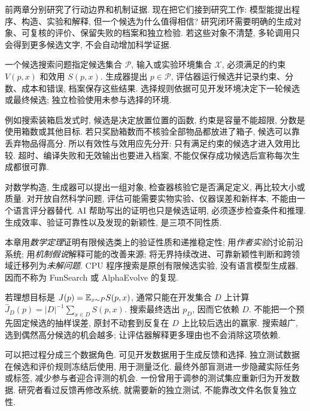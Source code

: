 \label{ch:research}
前两章分别研究了行动边界和机制证据. 现在把它们接到研究工作: 模型能提出程序、构造、实验和解释, 但一个候选为什么值得相信? 研究闭环需要明确的生成对象、可复核的评价、保留失败的档案和独立检验. 若这些对象不清楚, 多轮调用只会得到更多候选文字, 不会自动增加科学证据.

\begin{definition}
一个候选搜索问题指定候选集合 $\mathcal P$, 输入或实验环境集合 $\mathcal X$, 必须满足的约束 $V(p,x)$ 和效用 $S(p,x)$. 生成器提出 $p\in\mathcal P$, 评估器运行候选并记录约束、分数、成本和错误, 档案保存这些结果. 选择规则依据可见开发环境决定下一轮候选或最终候选; 独立检验使用未参与选择的环境.
\end{definition}
例如搜索装箱启发式时, 候选是决定放置位置的函数, 约束是容量不能超限, 分数是使用箱数或其他目标. 若只奖励箱数而不核验全部物品都放进了箱子, 候选可以靠丢弃物品得高分. 所以有效性与效用应先分开: 只有满足约束的候选才进入效用比较. 超时、编译失败和无效输出也要进入档案, 不能仅保存成功候选后宣称每次生成都很可靠.

对数学构造, 生成器可以提出一组对象, 检查器核验它是否满足定义, 再比较大小或质量. 对开放自然科学问题, 评估可能需要实物实验、仪器误差和新样本, 不能由一个语言评分器替代. AI 帮助写出的证明也只是候选证明, 必须逐步检查条件和推理. 生成效率、验证可靠性以及发现的新颖性, 是三项不同性质.

\begin{remark}
本章用\emph{数学定理}证明有限候选类上的验证性质和递推稳定性; 用\emph{作者实验}讨论前沿系统; 用\emph{机制假说}解释可能的改善来源; 将无界持续改进、可靠新颖性判断和跨领域迁移列为\emph{未解问题}. CPU 程序搜索是原创有限候选实验, 没有语言模型生成器, 因而不称为 FunSearch 或 AlphaEvolve 的复现.
\end{remark}

若理想目标是 $J(p)=\mathbb E_{x\sim P}S(p,x)$, 通常只能在开发集合 $D$ 上计算 $\widehat J_D(p)=|D|^{-1}\sum_{x\in D}S(p,x)$. 搜索最终选出 $p_D$, 因而它依赖 $D$. 不能把一个预先固定候选的抽样误差, 原封不动套到反复在 $D$ 上比较后选出的赢家. 搜索越广, 选到偶然高分候选的机会越多; 让评估器解释更多理由也不会消除这项依赖.

可以把过程分成三个数据角色. 可见开发数据用于生成反馈和选择. 独立测试数据在候选和评价规则冻结后使用, 用于测量泛化. 最终外部盲测进一步隐藏实际任务或标签, 减少参与者迎合评测的机会. 一份曾用于调参的测试集应重新归为开发数据. 研究者看过反馈再修改系统, 就需要新的独立测试, 不能靠改文件名恢复独立性.


